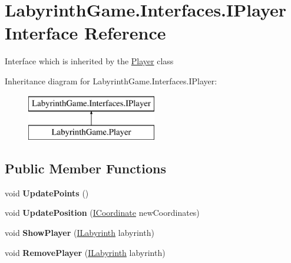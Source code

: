 \hypertarget{interface_labyrinth_game_1_1_interfaces_1_1_i_player}{\section{Labyrinth\+Game.\+Interfaces.\+I\+Player Interface Reference}
\label{interface_labyrinth_game_1_1_interfaces_1_1_i_player}
}


Interface which is inherited by the \hyperlink{class_labyrinth_game_1_1_player}{Player} class  


Inheritance diagram for Labyrinth\+Game.\+Interfaces.\+I\+Player\+:\begin{figure}[H]
\begin{center}
\leavevmode
\includegraphics[height=2.000000cm]{interface_labyrinth_game_1_1_interfaces_1_1_i_player}
\end{center}
\end{figure}
\subsection*{Public Member Functions}
\begin{DoxyCompactItemize}
\item 
\hypertarget{interface_labyrinth_game_1_1_interfaces_1_1_i_player_ac5434e0343d317b160fda2624bac1fb5}{void {\bfseries Update\+Points} ()}\label{interface_labyrinth_game_1_1_interfaces_1_1_i_player_ac5434e0343d317b160fda2624bac1fb5}

\item 
\hypertarget{interface_labyrinth_game_1_1_interfaces_1_1_i_player_a90eec2568366b814e522982d2dbb4c8d}{void {\bfseries Update\+Position} (\hyperlink{interface_labyrinth_game_1_1_interfaces_1_1_i_coordinate}{I\+Coordinate} new\+Coordinates)}\label{interface_labyrinth_game_1_1_interfaces_1_1_i_player_a90eec2568366b814e522982d2dbb4c8d}

\item 
\hypertarget{interface_labyrinth_game_1_1_interfaces_1_1_i_player_a95f66bba326c5034c5b37b89d93a2502}{void {\bfseries Show\+Player} (\hyperlink{interface_labyrinth_game_1_1_interfaces_1_1_i_labyrinth}{I\+Labyrinth} labyrinth)}\label{interface_labyrinth_game_1_1_interfaces_1_1_i_player_a95f66bba326c5034c5b37b89d93a2502}

\item 
\hypertarget{interface_labyrinth_game_1_1_interfaces_1_1_i_player_a3879574fee6f751f8b967697cb07b21c}{void {\bfseries Remove\+Player} (\hyperlink{interface_labyrinth_game_1_1_interfaces_1_1_i_labyrinth}{I\+Labyrinth} labyrinth)}\label{interface_labyrinth_game_1_1_interfaces_1_1_i_player_a3879574fee6f751f8b967697cb07b21c}

\end{DoxyCompactItemize}
